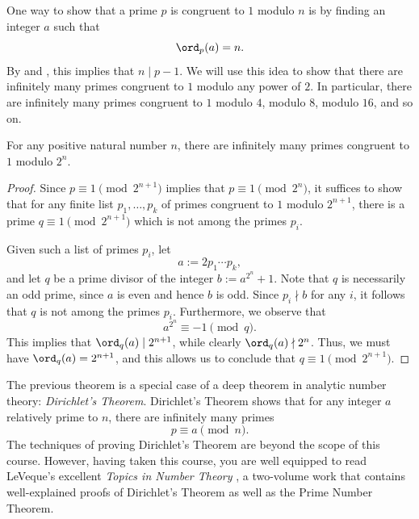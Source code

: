 One way to show that a prime $p$ is congruent to $1$ modulo $n$ is by finding an integer $a$ such that
\begin{equation*}
  \ord_p(a)=n.
\end{equation*}
By  and , this implies that $n\mid p-1$. We will use this idea to show that there are infinitely many primes congruent to $1$ modulo any power of $2$. In particular, there are infinitely many primes congruent to $1$ modulo $4$, modulo $8$, modulo $16$, and so on.

\begin{theorem}\label{theorem:infinitude-of-primes-1-mod-power-of-2}
  For any positive natural number $n$, there are infinitely many primes congruent to $1$ modulo $2^n$.
\end{theorem}

\begin{proof}
  Since $p\equiv 1\pmod{2^{n+1}}$ implies that $p\equiv 1\pmod{2^n}$, it suffices to show that for any finite list $p_1,\ldots,p_k$ of primes congruent to $1$ modulo $2^{n+1}$, there is a prime $q\equiv 1\pmod{2^{n+1}}$ which is not among the primes $p_i$.

  Given such a list of primes $p_i$, let
  \begin{equation*}
    a:=2p_1\cdots p_k,
  \end{equation*}
  and let $q$ be a prime divisor of the integer $b:=a^{2^n}+1$. Note that $q$ is necessarily an odd prime, since $a$ is even and hence $b$ is odd. Since $p_i\nmid b$ for any $i$, it follows that $q$ is not among the primes $p_i$. Furthermore, we observe that
  \begin{equation*}
    a^{2^n}\equiv -1\pmod{q}.
  \end{equation*}
  This implies that $\ord_q(a)\mid 2^{n+1}$, while clearly $\ord_q(a)\nmid 2^n$. Thus, we must have $\ord_q(a)=2^{n+1}$, and this allows us to conclude that $q\equiv 1\pmod{2^{n+1}}$.
\end{proof}

The previous theorem is a special case of a deep theorem in analytic number theory: \emph{Dirichlet's Theorem}. Dirichlet's Theorem shows that for any integer $a$ relatively prime to $n$, there are infinitely many primes
\begin{equation*}
  p\equiv a\pmod{n}.
\end{equation*}
The techniques of proving Dirichlet's Theorem are beyond the scope of this course. However, having taken this course, you are well equipped to read LeVeque's excellent \emph{Topics in Number Theory} \cite{leveque1956vol1,leveque1956vol2}, a two-volume work that contains well-explained proofs of Dirichlet's Theorem as well as the Prime Number Theorem.

